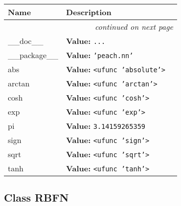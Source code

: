     \vspace{-1cm}
\hspace{\varindent}\begin{longtable}{|p{\varnamewidth}|p{\vardescrwidth}|l}
\cline{1-2}
\cline{1-2} \centering \textbf{Name} & \centering \textbf{Description}& \\
\cline{1-2}
\endhead\cline{1-2}\multicolumn{3}{r}{\small\textit{continued on next page}}\\\endfoot\cline{1-2}
\endlastfoot\raggedright \_\-\_\-d\-o\-c\-\_\-\_\- & \raggedright \textbf{Value:} 
{\tt \texttt{...}}&\\
\cline{1-2}
\raggedright \_\-\_\-p\-a\-c\-k\-a\-g\-e\-\_\-\_\- & \raggedright \textbf{Value:} 
{\tt \texttt{'}\texttt{peach.nn}\texttt{'}}&\\
\cline{1-2}
\raggedright a\-b\-s\- & \raggedright \textbf{Value:} 
{\tt {\textless}ufunc 'absolute'{\textgreater}}&\\
\cline{1-2}
\raggedright a\-r\-c\-t\-a\-n\- & \raggedright \textbf{Value:} 
{\tt {\textless}ufunc 'arctan'{\textgreater}}&\\
\cline{1-2}
\raggedright c\-o\-s\-h\- & \raggedright \textbf{Value:} 
{\tt {\textless}ufunc 'cosh'{\textgreater}}&\\
\cline{1-2}
\raggedright e\-x\-p\- & \raggedright \textbf{Value:} 
{\tt {\textless}ufunc 'exp'{\textgreater}}&\\
\cline{1-2}
\raggedright p\-i\- & \raggedright \textbf{Value:} 
{\tt 3.14159265359}&\\
\cline{1-2}
\raggedright s\-i\-g\-n\- & \raggedright \textbf{Value:} 
{\tt {\textless}ufunc 'sign'{\textgreater}}&\\
\cline{1-2}
\raggedright s\-q\-r\-t\- & \raggedright \textbf{Value:} 
{\tt {\textless}ufunc 'sqrt'{\textgreater}}&\\
\cline{1-2}
\raggedright t\-a\-n\-h\- & \raggedright \textbf{Value:} 
{\tt {\textless}ufunc 'tanh'{\textgreater}}&\\
\cline{1-2}
\end{longtable}



\subsection{Class RBFN}

